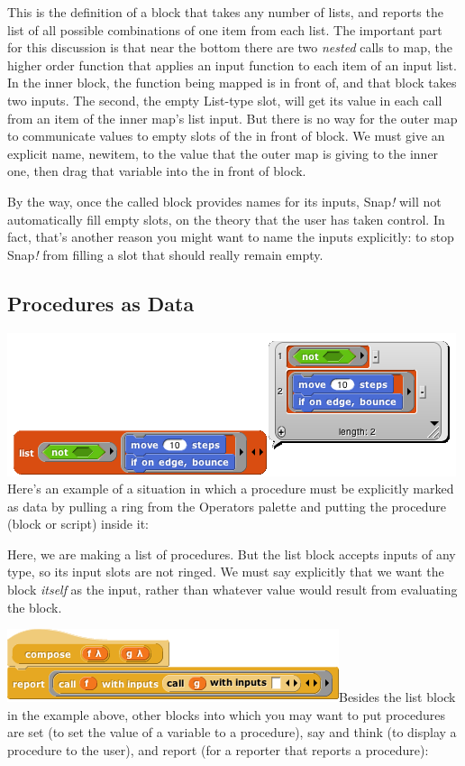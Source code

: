 This is the definition of a block that takes any number of lists, and
reports the list of all possible combinations of one item from each
list. The important part for this discussion is that near the bottom
there are two \emph{nested} calls to map, the higher order function that
applies an input function to each item of an input list. In the inner
block, the function being mapped is in front of, and that block takes
two inputs. The second, the empty List-type slot, will get its value in
each call from an item of the inner map's list input. But there is no
way for the outer map to communicate values to empty slots of the in
front of block. We must give an explicit name, newitem, to the value
that the outer map is giving to the inner one, then drag that variable
into the in front of block.

By the way, once the called block provides names for its inputs,
Snap\emph{!} will not automatically fill empty slots, on the theory that
the user has taken control. In fact, that's another reason you might
want to name the inputs explicitly: to stop Snap\emph{!} from filling a
slot that should really remain empty.

\subsection{Procedures as Data}\label{procedures-as-data-1}

\includegraphics[width=5.1875in,height=1.65625in]{media/image734.png}Here's
an example of a situation in which a procedure must be explicitly marked
as data by pulling a ring from the Operators palette and putting the
procedure (block or script) inside it:

Here, we are making a list of procedures. But the list block accepts
inputs of any type, so its input slots are not ringed. We must say
explicitly that we want the block \emph{itself} as the input, rather
than whatever value would result from evaluating the block.

\includegraphics[width=3.83333in,height=0.84375in]{media/image735.png}Besides
the list block in the example above, other blocks into which you may
want to put procedures are set (to set the value of a variable to a
procedure), say and think (to display a procedure to the user), and
report (for a reporter that reports a procedure):

